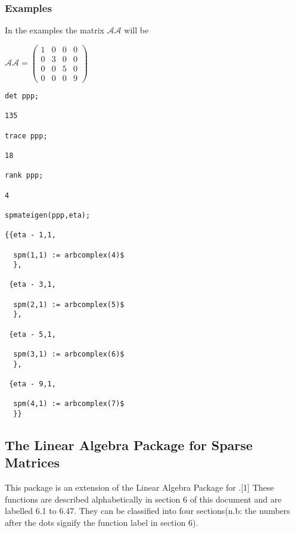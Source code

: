 \subsubsection{Examples}
In the examples the matrix $\mathcal{AA}$ will be 

\begin{flushleft}
\begin{math}
\mathcal{AA} = \left( \begin{array}{cccc} 1 & 0 & 0 & 0 \\ 0 & 3 & 0 & 0 \\ 
0 & 0 & 5 & 0 \\ 0 & 0 & 0 & 9
\end{array} \right)
\end{math}
\end{flushleft}
\begin {verbatim}
det ppp;

135

trace ppp;

18

rank ppp;

4

spmateigen(ppp,eta);

{{eta - 1,1,

  spm(1,1) := arbcomplex(4)$
  },

 {eta - 3,1,

  spm(2,1) := arbcomplex(5)$
  },

 {eta - 5,1,

  spm(3,1) := arbcomplex(6)$
  },

 {eta - 9,1,

  spm(4,1) := arbcomplex(7)$
  }}
\end{verbatim}

\subsection{The Linear Algebra Package for Sparse Matrices}
This package is an extension of the Linear Algebra Package for \REDUCE{}.[1]
These functions are described 
alphabetically in section 6 of this document and are labelled 6.1 to 
6.47. They can be classified into four sections(n.b: the numbers after 
the dots signify the function label in section 6).
